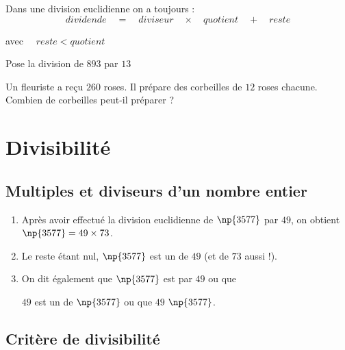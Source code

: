 \documentclass[a4paper,10pt]{report}
\begin{document}
\begin{prop}
Dans une division euclidienne on a toujours : $$dividende \quad = \quad diviseur \quad \times \quad quotient \quad + \quad reste $$

\noindent avec $ \quad reste  < quotient$
\end{prop}

\begin{ex}
Pose la division de $893$ par $13$

\medskip\noindent\grandscarreaux{\linewidth}{4.8cm}
\end{ex} 

\begin{ex}
Un fleuriste a reçu $260$ roses. Il prépare des corbeilles de $12$ roses chacune. Combien de corbeilles peut-il préparer ?

\noindent\grandscarreaux{\linewidth}{4cm}
\end{ex}

\section{Divisibilité}

\subsection{Multiples et diviseurs d'un nombre entier}


\begin{enumerate}
\item[•]Après avoir effectué la division euclidienne de $\np{3577}$ par $49$, on obtient $\np{3577}=49\times 73$.\medskip
\item[•]Le reste étant nul, $\np{3577}$ est un \dotfill de $49$ (et de $73$ aussi !).\medskip
\item[•]On dit également que $\np{3577}$ est \dotfill par $49$ ou que 

\medskip $49$ est un \dotfill de $\np{3577}$ ou que $49$ \dotfill  $\np{3577}$.
\end{enumerate} 

\subsection{Critère de divisibilité}
\end{document}
